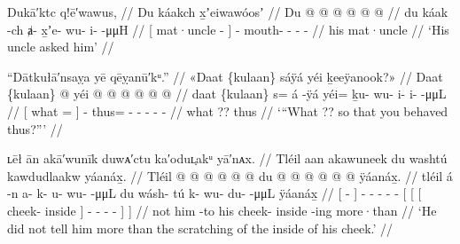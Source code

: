 \ex\label{ex:91-62-uncle-asked-him}%
%
\begingl
	\glpreamble	Dukā′ktc q!ē′wawus, //
	\glpreamble	Du káakch x̱ʼeiwawóosʼ //
	\gla	{} Du  @ {} {}
		 @ {} @ {} @ {} @ {} @ {} //
	\glb	{} du káak -ch {}
		ⱥ- x̱ʼe- wu- i-  -μμH //
	\glc	{}[  mat·uncle - {}]
		- mouth- - -  - //
	\gld	{} his mat·uncle {} {}
		 {} {} {} {} {} //
	\glft	‘His uncle asked him’
		//
\endgl
\xe

\ex\label{ex:91-63-}%
%
\begingl
	\glpreamble	“Dātkułā′nsaỵa yē qēỵanū′kᵘ.” //
	\glpreamble	«\!Daat \{kulaan\} sáÿá yéi ḵeeÿanook?\!» //
	\gla	{} Daat \{kulaan\}  {} {} @ {}
		yéi @  @ {} @ {} @ {} @ {} @ {} //
	\glb	{} daat \{kulaan\} s= {} á -ÿá
		yéi= ḵu- wu- i- i-  -μμL //
	\glc	{}[ what {} = {}]  -
		thus= - - - -  - //
	\gld	{} what ?? {} {}  {}
		thus  //
	\glft	‘“What ?? so that you behaved thus?”’
		//
\endgl
\xe


\ex\label{ex:91-64-not-tell-more-than-cheek-scratch}%
%
\begingl
	\glpreamble	ʟēł ān akā′wunīk duwᴀ′ctu ka′oduʟ̣akᵘ yā′nᴀx. //
	\glpreamble	Tléil aan akawuneek du washtú kawdudlaakw yáanáx̱. //
	\gla	Tléil {}  @ {} {}
		 @ {} @ {} @ {} @ {} @ {}
		{} {} {} du  @ {} {}
				 @ {} @ {} @ {} @ {} @ {} {}
			ÿáanáx̱. {} //
	\glb	tléil {} á -n {}
		a- k- u- wu-  -μμL
		{} {} {} du wásh- tú {}
				k- wu- du-  -μμL {} {}
			ÿáanáx̱ {} //
	\glc	{} {}[  - {}]
		- - - -  -
		{}[ {}[ {}[  cheek- inside {}]
				- - -  - \· {}]
			 {}] //
	\gld	not {} him -to {}
		 {} {} {} {} {}
		{} {} {} his cheek- inside {}
				 {} {} {} {} -ing {}
			more·than {} //
	\glft	‘He did not tell him more than the scratching of the inside of his cheek.’
		//
\endgl
\xe


